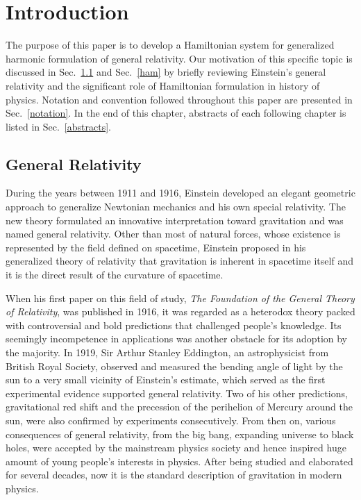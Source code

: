 \chapter{Introduction}\label{background}
The purpose of this paper is to develop a Hamiltonian system for generalized harmonic formulation of general relativity. Our motivation of this specific topic is discussed in Sec.~\ref{gr} and Sec.~\ref{ham} by briefly reviewing Einstein's general relativity and the significant role of Hamiltonian formulation in history of physics. Notation and convention followed throughout this paper are presented in Sec.~\ref{notation}. In the end of this chapter, abstracts of each following chapter is listed in Sec.~\ref{abstracts}.
\section{General Relativity}\label{gr}
During the years between 1911 and 1916, Einstein developed an elegant geometric approach to generalize Newtonian mechanics and his own special relativity. The new theory formulated an innovative interpretation toward gravitation and was named general relativity. Other than most of natural forces, whose existence is represented by the field defined on spacetime, Einstein proposed in his generalized theory of relativity that gravitation is inherent in spacetime itself and it is the direct result of the curvature of spacetime\cite{carroll2003spacetime}.

When his first paper on this field of study, {\it The Foundation of the General Theory of Relativity}, was published in 1916, it was regarded as a heterodox theory packed with controversial and bold predictions that challenged people's knowledge. Its seemingly incompetence in applications was another obstacle for its adoption by the majority. In 1919, Sir Arthur Stanley Eddington, an astrophysicist from British Royal Society, observed and measured the bending angle of light by the sun to a very small vicinity of Einstein's estimate, which served as the first experimental evidence supported general relativity. Two of his other predictions, gravitational red shift and the precession of the perihelion of Mercury around the sun, were also confirmed by experiments consecutively. From then on, various consequences of general relativity, from the big bang, expanding universe to black holes, were accepted by the mainstream physics society and hence inspired huge amount of young people's interests in physics. After being studied and elaborated for several decades, now it is the standard description of gravitation in modern physics. 

